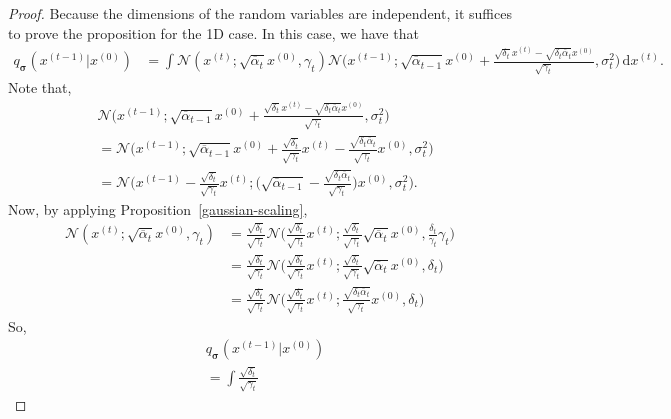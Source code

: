 \documentclass[10pt]{article}
\newcommand{\dee}{\mathrm{d}}
\newcommand{\ves}[1]{\boldsymbol{#1}}
\newcommand{\mcal}[1]{\mathcal{#1}}
\begin{document}
\begin{itemize}
\begin{proof}
    Because the dimensions of the random variables are independent, it suffices to prove the proposition for the 1D case. In this case, we have that
    \begin{align*}
      q_{\ves{\sigma}}(x^{(t-1)}|x^{(0)}) 
      &= \int \mcal{N}(x^{(t)}; \sqrt{\overline{\alpha}_t} x^{(0)}, \gamma_t)
      \mcal{N}\bigg(x^{(t-1)};\sqrt{\overline{\alpha}_{t-1}} x^{(0)} + \frac{\sqrt{\delta_t}x^{(t)} - \sqrt{\delta_t \overline{\alpha}_t}x^{(0)}}{\sqrt{\gamma_t}}, \sigma^2_t  \bigg)\, \dee x^{(t)}.
    \end{align*}
    Note that,
    \begin{align*}
      &\mcal{N}\bigg(x^{(t-1)};\sqrt{\overline{\alpha}_{t-1}} x^{(0)} + \frac{\sqrt{\delta_t}x^{(t)} - \sqrt{\delta_t \overline{\alpha}_t}x^{(0)}}{\sqrt{\gamma_t}}, \sigma^2_t  \bigg)\\
      &= \mcal{N}\bigg(x^{(t-1)};\sqrt{\overline{\alpha}_{t-1}} x^{(0)} + \frac{\sqrt{\delta_t} }{\sqrt{\gamma_t}} x^{(t)} - \frac{\sqrt{\delta_t \overline{\alpha}_t} }{\sqrt{\gamma_t}} x^{(0)}, \sigma^2_t \bigg) \\
      &= \mcal{N}\bigg(x^{(t-1)} - \frac{\sqrt{\delta_t} }{\sqrt{\gamma_t}} x^{(t)} ; \bigg( \sqrt{\overline{\alpha}_{t-1}}  - \frac{\sqrt{\delta_t \overline{\alpha}_t} }{\sqrt{\gamma_t}} \bigg) x^{(0)}, \sigma^2_t \bigg).
    \end{align*}
    Now, by applying Proposition~\ref{gaussian-scaling},
    \begin{align*}
      \mcal{N}(x^{(t)}; \sqrt{\overline{\alpha}_t}x^{(0)}, \gamma_t ) 
      &= \frac{\sqrt{\delta_t} }{\sqrt{\gamma_t}} \mcal{N}\bigg( \frac{\sqrt{\delta_t} }{\sqrt{\gamma_t}} x^{(t)}; \frac{\sqrt{\delta_t} }{\sqrt{\gamma_t}} \sqrt{\overline{\alpha}_t}x^{(0)}, \frac{\delta_t }{\gamma_t} \gamma_t \bigg) \\
      &= \frac{\sqrt{\delta_t} }{\sqrt{\gamma_t}} \mcal{N}\bigg( \frac{\sqrt{\delta_t} }{\sqrt{\gamma_t}} x^{(t)}; \frac{\sqrt{\delta_t} }{\sqrt{\gamma_t}} \sqrt{\overline{\alpha}_t}x^{(0)}, \delta_t \bigg) \\
      &= \frac{\sqrt{\delta_t} }{\sqrt{\gamma_t}} \mcal{N}\bigg( \frac{\sqrt{\delta_t} }{\sqrt{\gamma_t}} x^{(t)}; \frac{\sqrt{\delta_t \overline{\alpha}_t} }{\sqrt{\gamma_t}} x^{(0)}, \delta_t \bigg)
    \end{align*}
    So,
    \begin{align*}
      &q_{\ves{\sigma}}(x^{(t-1)}|x^{(0)}) \\
      &= \int \frac{\sqrt{\delta_t} }{\sqrt{\gamma_t}} 

\end{align*}
\end{proof}
\end{itemize}
\end{document}
